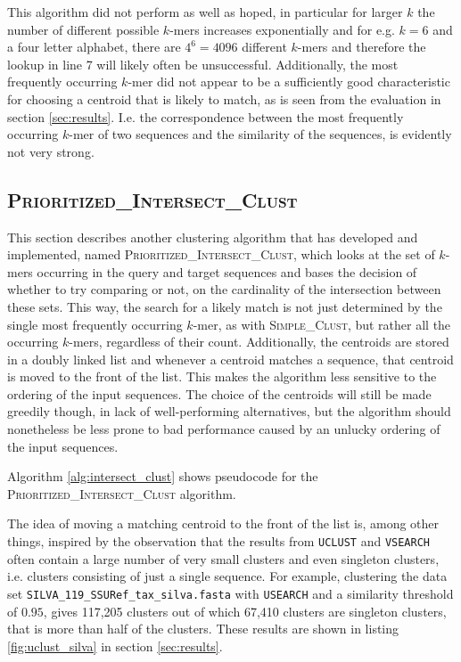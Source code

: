 This algorithm did not perform as well as hoped, in particular for larger $k$
the number of different possible $k$-mers increases exponentially and for e.g.
$k = 6$ and a four letter alphabet, there are $4^6 = 4096$ different $k$-mers
and therefore the lookup in line 7 will likely often be unsuccessful.
Additionally, the most frequently occurring $k$-mer did not appear to be a
sufficiently good characteristic for choosing a centroid that is likely to
match, as is seen from the evaluation in section \ref{sec:results}. I.e. the
correspondence between the most frequently occurring $k$-mer of two sequences
and the similarity of the sequences, is evidently not very strong.  %


\subsection{\textsc{Prioritized\_Intersect\_Clust}}

This section describes another clustering algorithm that has developed and
implemented, named \textsc{Prioritized\_Intersect\_Clust}, which looks at the
set of $k$-mers occurring in the query and target sequences and bases the
decision of whether to try comparing or not, on the cardinality of the
intersection between these sets. This way, the search for a likely match is not
just determined by the single most frequently occurring $k$-mer, as with
\textsc{Simple\_Clust}, but rather all the occurring $k$-mers, regardless of
their count. Additionally, the centroids are stored in a doubly linked list and
whenever a centroid matches a sequence, that centroid is moved to the front of
the list. This makes the algorithm less sensitive to the ordering of the input
sequences. The choice of the centroids will still be made greedily though, in
lack of well-performing alternatives, but the algorithm should nonetheless be
less prone to bad performance caused by an unlucky ordering of the input
sequences.

Algorithm \ref{alg:intersect_clust} shows pseudocode for the
\textsc{Prioritized\_Intersect\_Clust} algorithm.

The idea of moving a matching centroid to the front of the list is, among other
things, inspired by the observation that the results from \texttt{UCLUST} and
\texttt{VSEARCH} often contain a large number of very small clusters and even
singleton clusters, i.e. clusters consisting of just a single sequence. For
example, clustering the data set \texttt{SILVA\_119\_SSURef\_tax\_silva.fasta}
with \texttt{USEARCH} and a similarity threshold of $0.95$, gives 117,205
clusters out of which 67,410 clusters are singleton clusters, that is more than
half of the clusters. These results are shown in listing \ref{fig:uclust_silva}
in section \ref{sec:results}.

